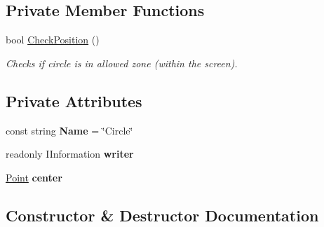 \subsection*{Private Member Functions}
\begin{DoxyCompactItemize}
\item 
bool \mbox{\hyperlink{class_home_work_1_1_task_library_1_1_tasks_1_1_lesson6_1_1_task2_1_1_classes_1_1_circle_a283db57c673ff5f823709a2a5c692d84}{Check\+Position}} ()
\begin{DoxyCompactList}\small\item\em Checks if circle is in allowed zone (within the screen). \end{DoxyCompactList}\end{DoxyCompactItemize}
\subsection*{Private Attributes}
\begin{DoxyCompactItemize}
\item 
\mbox{\label{class_home_work_1_1_task_library_1_1_tasks_1_1_lesson6_1_1_task2_1_1_classes_1_1_circle_afe3165ffdadfabc17aeaa7c6f37a0362}} 
const string {\bfseries Name} = \char`\"{}Circle\char`\"{}
\item 
\mbox{\label{class_home_work_1_1_task_library_1_1_tasks_1_1_lesson6_1_1_task2_1_1_classes_1_1_circle_a34fca1503882492b06c923f54709f7b9}} 
readonly I\+Information {\bfseries writer}
\item 
\mbox{\label{class_home_work_1_1_task_library_1_1_tasks_1_1_lesson6_1_1_task2_1_1_classes_1_1_circle_a902beafbb4789362d38bfd7c584e077b}} 
\mbox{\hyperlink{struct_home_work_1_1_task_library_1_1_tasks_1_1_lesson6_1_1_task2_1_1_classes_1_1_point}{Point}} {\bfseries center}
\end{DoxyCompactItemize}


\subsection{Constructor \& Destructor Documentation}
\mbox{\label{class_home_work_1_1_task_library_1_1_tasks_1_1_lesson6_1_1_task2_1_1_classes_1_1_circle_a11decfea1be71225318df9104f997019}} 
